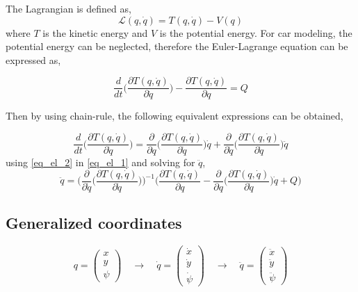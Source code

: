 \documentclass[12pt]{article}
\begin{document}
The Lagrangian is defined as,
\begin{equation}
\mathcal{L} (q,\dot{q}) = T(q,\dot{q}) - V(q)    
\end{equation}
where $T$ is the kinetic energy and $V$ is the potential energy. For car modeling, the potential energy can be neglected, therefore the Euler-Lagrange equation can be expressed as,

\begin{equation} \label{eq_el_1}
    \frac{d}{dt} \Big( \frac{\partial T(q,\dot{q}) }{\partial \dot{q}} \Big) - \frac{\partial T(q,\dot{q}) }{\partial q} = Q
\end{equation}

Then by using chain-rule, the following equivalent expressions can be obtained,

\begin{equation} \label{eq_el_2}
  \frac{d}{dt} \Big( \frac{\partial T(q,\dot{q}) }{\partial \dot{q}} \Big) = \frac{\partial }{\partial q} \Big( \frac{\partial T(q,\dot{q})}{\partial \dot{q}} \Big) \dot{q} + \frac{\partial }{\partial \dot{q}} \Big( \frac{\partial T(q,\dot{q})}{\partial \dot{q}} \Big) \ddot{q}  
\end{equation}
using \eqref{eq_el_2} in \eqref{eq_el_1} and solving for $\ddot{q}$,
\begin{equation}
    \ddot{q} =  \Bigg(  \frac{\partial }{\partial \dot{q}} \Big( \frac{\partial T(q,\dot{q})}{\partial \dot{q}} \Big) \Bigg)^{-1} \Bigg( \frac{ \partial T(q,\dot{q})}{\partial q} - \frac{\partial }{\partial q} \Big( \frac{\partial T(q,\dot{q})}{\partial \dot{q}} \Big) \dot{q} + Q \Bigg)
\end{equation}
\subsection{Generalized coordinates}
\begin{equation} \label{Generalized_coordinates_eq}
    q = \begin{pmatrix} x \\ y \\ \psi \end{pmatrix} \quad \longrightarrow \quad \dot{q} = \begin{pmatrix} \dot{x} \\ \dot{y} \\ \dot{\psi} \end{pmatrix} \quad \longrightarrow \quad \ddot{q} = \begin{pmatrix} \ddot{x} \\ \ddot{y} \\ \ddot{\psi} \end{pmatrix}
\end{equation}
\end{document}
